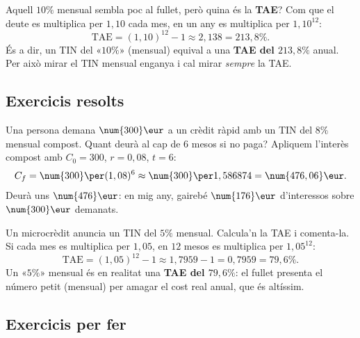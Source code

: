 \begin{exemple}
Aquell $10\%$ mensual sembla poc al fullet, però quina és la \textbf{TAE}? Com que el
deute es multiplica per $1,10$ cada mes, en un any es multiplica per $1,10^{12}$:
\[
\text{TAE}=(1,10)^{12}-1\approx 2,138=213,8\%.
\]
És a dir, un TIN del «$10\%$» (mensual) equival a una \textbf{TAE del $213,8\%$}
anual. Per això mirar el TIN mensual enganya i cal mirar \emph{sempre} la TAE.
\end{exemple}

\subsection{Exercicis resolts}

\begin{exresolt}
Una persona demana $\num{300}\eur$ a un crèdit ràpid amb un TIN del $8\%$ mensual
compost. Quant deurà al cap de $6$ mesos si no paga?
\solucio
Apliquem l'interès compost amb $C_0=\num{300}$, $r=0,08$, $t=6$:
\[
C_f=\num{300}\per (1,08)^{6}\approx\num{300}\per 1,586874=\num{476,06}\eur.
\]
Deurà uns $\num{476}\eur$: en mig any, gairebé $\num{176}\eur$ d'interessos sobre
$\num{300}\eur$ demanats.
\end{exresolt}

\begin{exresolt}
Un microcrèdit anuncia un TIN del $5\%$ mensual. Calcula'n la TAE i comenta-la.
\solucio
Si cada mes es multiplica per $1,05$, en $12$ mesos es multiplica per $1,05^{12}$:
\[
\text{TAE}=(1,05)^{12}-1\approx 1,7959-1=0,7959=79,6\%.
\]
Un «$5\%$» mensual és en realitat una \textbf{TAE del $79,6\%$}: el fullet presenta el
número petit (mensual) per amagar el cost real anual, que és altíssim.
\end{exresolt}

\subsection{Exercicis per fer}

